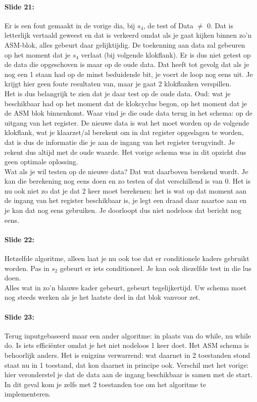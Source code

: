 \documentclass[10pt,a4paper]{book}
\begin{document}
\paragraph{Slide 21:} Er is een fout gemaakt in de vorige dia, bij $s_4$, de test of Data $\neq$ 0. Dat is letterlijk vertaald geweest en dat is verkeerd omdat als je gaat kijken binnen zo'n ASM-blok, alles gebeurt daar gelijktijdig. De toekenning aan data zal gebeuren op het moment dat je $s_4$ verlaat (bij volgende klokflank). Er is dus niet getest op de data die opgeschoven is maar op de oude data. Dat heeft tot gevolg dat als je nog een 1 staan had op de minst beduidende bit, je voert de loop nog eens uit. Je krijgt hier geen foute resultaten van, maar je gaat 2 klokflanken verspillen.\\
Het is dus belangrijk te zien dat je daar test op de oude data. Oud: wat je beschikbaar had op het moment dat de klokcyclus begon, op het moment dat je de ASM blok binnenkomt. Waar vind je die oude data terug in het schema: op de uitgang van het register. De nieuwe data is wat het moet worden op de volgende klokflank, wat je klaarzet/al berekent om in dat register opgeslagen te worden, dat is dus de informatie die je aan de ingang van het register terugvindt. Je rekent dus altijd met de oude waarde. Het vorige schema was in dit opzicht dus geen optimale oplossing.\\
Wat als je wil testen op de nieuwe data? Dat wat daarboven berekend wordt. Je kan die berekening nog eens doen en zo testen of dat verschillend is van 0. Het is nu ook niet zo dat je dat 2 keer moet berekenen: het is wat op dat moment aan de ingang van het register beschikbaar is, je legt een draad daar naartoe aan en je kan dat nog eens gebruiken. Je doorloopt dus niet nodeloos dat bericht nog eens.

\paragraph{Slide 22:} Hetzelfde algoritme, alleen laat je nu ook toe dat er conditionele kaders gebruikt worden. Pas in $s_2$ gebeurt er iets conditioneel. Je kan ook diezelfde test in die lus doen.\\
Alles wat in zo'n blauwe kader gebeurt, gebeurt tegelijkertijd. Uw schema moet nog steeds werken als je het laatste deel in dat blok vanvoor zet. 

\paragraph{Slide 23:} Terug inputgebaseerd maar een ander algoritme: in plaats van do while, nu while do. Is iets effici\"enter omdat je het niet nodeloos 1 keer doet. Het ASM schema is behoorlijk anders. Het is enigzins verwarrend: wat daarnet in 2 toestanden stond staat nu in 1 toestand, dat kon daarnet in principe ook. Verschil met het vorige: hier veronderstel je dat de data aan de ingang beschikbaar is samen met de start. In dit geval kom je zelfs met 2 toestanden toe om het algoritme te implementeren.
\end{document}
